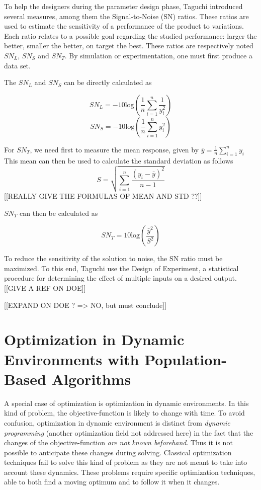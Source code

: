 To help the designers during the parameter design phase, Taguchi introduced several measures, among them the Signal-to-Noise (SN) ratios. These ratios are used to estimate the sensitivity of a performance of the product to variations. Each ratio relates to a possible goal regarding the studied performance: larger the better, smaller the better, on target the best. These ratios are respectively noted $SN_L$, $SN_S$ and $SN_T$.
By simulation or experimentation, one must first produce a data set.

The $SN_L$ and $SN_S$ can be directly calculated as

\[SN_L = -10\text{log}\left( \frac{1}{n} \sum_{i=1}^n \frac{1}{y_i^2} \right)\]
\[SN_S = -10\text{log}\left( \frac{1}{n} \sum_{i=1}^n y_i^2 \right)\]

For $SN_T$, we need first to measure the mean response, given by $\bar{y} = \frac{1}{n}\sum_{i=1}^n y_i$
This mean can then be used to calculate the standard deviation as follows 
\[S = \sqrt{\sum_{i=1}^n \frac{(y_i - \bar{y})^2}{n-1}}\]
[[REALLY GIVE THE FORMULAS OF MEAN AND STD ??]]

 $SN_T$ can then be calculated as
 
 \[ SN_T = 10\text{log}\left(\frac{\bar{y}^2}{S^2}\right) \]
 
To reduce the sensitivity of the solution to noise, the SN ratio must be maximized. To this end, Taguchi use the Design of Experiment, a statistical procedure for determining the effect of multiple inputs on a desired output. [[GIVE A REF ON DOE]]

[[EXPAND ON DOE  ? => NO, but must conclude]]


\section{Optimization in Dynamic Environments with Population-Based Algorithms}

A special case of optimization is optimization in dynamic environments. In this kind of problem, the objective-function is likely to change with time. To avoid confusion, optimization in dynamic environment is distinct from \emph{dynamic programming} (another optimization field not addressed here) in the fact that the changes of the objective-function \emph{are not known beforehand}. Thus it is not possible to anticipate these changes during solving.
Classical optimization techniques fail to solve this kind of problem as they are not meant to take into account these dynamics. These problems require specific optimization techniques, able to both find a moving optimum and to follow it when it changes.

